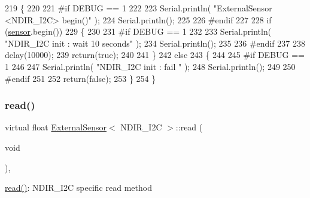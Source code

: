 \begin{DoxyCode}
219     \{
220     
221 \textcolor{preprocessor}{    #if DEBUG == 1 }
222 
223         Serial.println( \textcolor{stringliteral}{"ExternalSensor <NDIR\_I2C> begin()"} );
224         Serial.println();
225     
226 \textcolor{preprocessor}{    #endif }
227 
228         \textcolor{keywordflow}{if} (\hyperlink{classExternalSensor_3_01NDIR__I2C_01_4_ae541c9cece7c38674b70114cdb74a7dc}{sensor}.begin()) 
229         \{
230         
231 \textcolor{preprocessor}{        #if DEBUG == 1 }
232             
233             Serial.println( \textcolor{stringliteral}{"NDIR\_I2C init : wait 10 seconds"} );
234             Serial.println();
235         
236 \textcolor{preprocessor}{        #endif}
237 
238             delay(10000);
239             \textcolor{keywordflow}{return}(\textcolor{keyword}{true});
240 
241             \}
242         \textcolor{keywordflow}{else} 
243         \{
244         
245 \textcolor{preprocessor}{        #if DEBUG == 1 }
246 
247             Serial.println( \textcolor{stringliteral}{"NDIR\_I2C init : fail "} );
248             Serial.println();
249         
250 \textcolor{preprocessor}{        #endif}
251 
252             \textcolor{keywordflow}{return}(\textcolor{keyword}{false});
253         \}   
254     \}
\end{DoxyCode}
\mbox{\label{classExternalSensor_3_01NDIR__I2C_01_4_a239d18652e9fb4673842ae9726edf44f}} 
\subsubsection{\texorpdfstring{read()}{read()}}
{\footnotesize\ttfamily virtual float \hyperlink{classExternalSensor}{External\+Sensor}$<$ N\+D\+I\+R\+\_\+\+I2C $>$\+::read (\begin{DoxyParamCaption}\item[{void}]{ }\end{DoxyParamCaption})\hspace{0.3cm}{\ttfamily [inline]}, {\ttfamily [virtual]}}

\hyperlink{classExternalSensor_3_01NDIR__I2C_01_4_a239d18652e9fb4673842ae9726edf44f}{read()}\+: N\+D\+I\+R\+\_\+\+I2C specific read method

